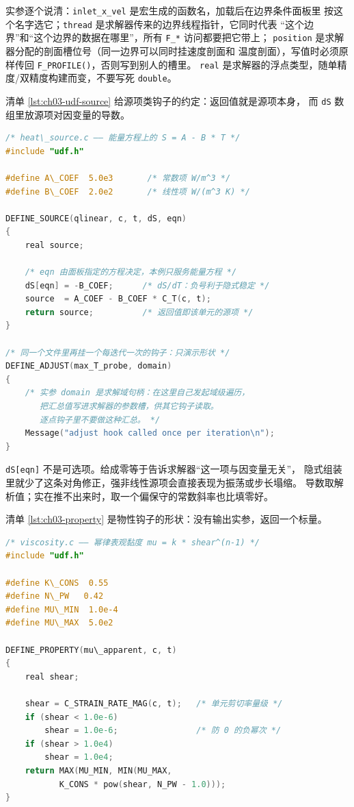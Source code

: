 \documentclass[12pt,a4paper,fontset=fandol]{ctexbook}
\newcommand{\Fn}[1]{\texttt{#1()}}
\newcommand{\Tp}[1]{\texttt{#1}}
\begin{document}
实参逐个说清：\Tp{inlet\_x\_vel} 是宏生成的函数名，加载后在边界条件面板里
按这个名字选它；\Tp{thread} 是求解器传来的边界线程指针，它同时代表
``这个边界''和``这个边界的数据在哪里''，所有 \Tp{F\_*} 访问都要把它带上；
\Tp{position} 是求解器分配的剖面槽位号（同一边界可以同时挂速度剖面和
温度剖面），写值时必须原样传回 \Fn{F\_PROFILE}，否则写到别人的槽里。
\Tp{real} 是求解器的浮点类型，随单精度/双精度构建而变，不要写死 \Tp{double}。

清单 \ref{lst:ch03-udf-source} 给源项类钩子的约定：返回值就是源项本身，
而 \Tp{dS} 数组里放源项对因变量的导数。

\begin{lstlisting}[language=C, style=cstyle, caption={UDF：线性热源项（单元遍历 + 导数入雅可比）}, label={lst:ch03-udf-source}]
/* heat\_source.c —— 能量方程上的 S = A - B * T */
#include "udf.h"

#define A\_COEF  5.0e3       /* 常数项 W/m^3 */
#define B\_COEF  2.0e2       /* 线性项 W/(m^3 K) */

DEFINE_SOURCE(qlinear, c, t, dS, eqn)
{
    real source;

    /* eqn 由面板指定的方程决定，本例只服务能量方程 */
    dS[eqn] = -B_COEF;      /* dS/dT：负号利于隐式稳定 */
    source  = A_COEF - B_COEF * C_T(c, t);
    return source;          /* 返回值即该单元的源项 */
}

/* 同一个文件里再挂一个每迭代一次的钩子：只演示形状 */
DEFINE_ADJUST(max_T_probe, domain)
{
    /* 实参 domain 是求解域句柄：在这里自己发起域级遍历，
       把汇总值写进求解器的参数槽，供其它钩子读取。
       逐点钩子里不要做这种汇总。 */
    Message("adjust hook called once per iteration\n");
}
\end{lstlisting}

\begin{note}[title={源项一定要给导数}]
\Tp{dS[eqn]} 不是可选项。给成零等于告诉求解器``这一项与因变量无关''，
隐式组装里就少了这条对角修正，强非线性源项会直接表现为振荡或步长塌缩。
导数取解析值；实在推不出来时，取一个偏保守的常数斜率也比填零好。
\end{note}

清单 \ref{lst:ch03-property} 是物性钩子的形状：没有输出实参，返回一个标量。

\begin{lstlisting}[language=C, style=cstyle, caption={UDF：表观黏度（物性钩子，单元进标量出）}, label={lst:ch03-property}]
/* viscosity.c —— 幂律表观黏度 mu = k * shear^(n-1) */
#include "udf.h"

#define K\_CONS  0.55
#define N\_PW   0.42
#define MU\_MIN  1.0e-4
#define MU\_MAX  5.0e2

DEFINE_PROPERTY(mu\_apparent, c, t)
{
    real shear;

    shear = C_STRAIN_RATE_MAG(c, t);   /* 单元剪切率量级 */
    if (shear < 1.0e-6)
        shear = 1.0e-6;                /* 防 0 的负幂次 */
    if (shear > 1.0e4)
        shear = 1.0e4;
    return MAX(MU_MIN, MIN(MU_MAX,
           K_CONS * pow(shear, N_PW - 1.0)));
}
\end{lstlisting}
\end{document}
